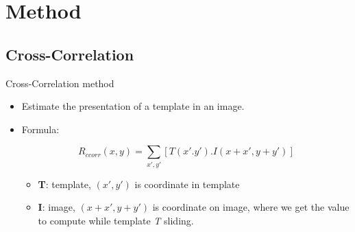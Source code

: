 \documentclass{beamer}
\begin{document}
\section{Method}
\subsection{Cross-Correlation}                                                              
\begin{frame}{Cross-Correlation method}
	\begin{itemize}
		\item Estimate the presentation of a template in an image.
		\item Formula:
			\begin{center}
				\begin{equation}\label{eq:cross-correlation}
					R_{ccorr}(x,y) = \sum\limits_{x',y'}[T(x'.y').I(x + x', y + y')]
				\end{equation}
			\end{center}
			\begin{itemize}
				\item \textbf{T}: template, $(x', y')$ is coordinate in template
				\item \textbf{I}: image, $(x + x', y + y')$ is coordinate on image, where we get the value to compute while template \textit{T} sliding.
			\end{itemize}
	\end{itemize}
\end{frame}

\end{document}
